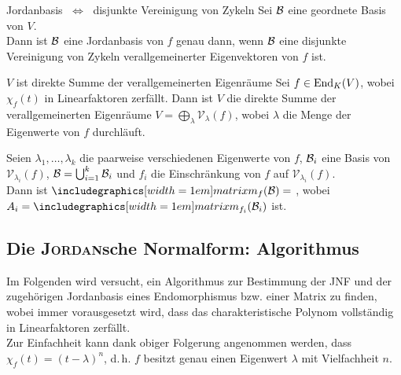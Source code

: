 \begin{Satz}{Jordanbasis $\;\Leftrightarrow\;$
             disjunkte Vereinigung von Zykeln}
    Sei $\mathcal{B}$ eine geordnete Basis von $V$. \\
    Dann ist $\mathcal{B}$ eine Jordanbasis von $f$ genau dann, wenn
    $\mathcal{B}$ eine disjunkte Vereinigung von Zykeln verallgemeinerter
    Eigenvektoren von $f$ ist.
\end{Satz}

\begin{Satz}{$V$ ist direkte Summe der verallgemeinerten Eigenräume}
    Sei $f \in \operatorname{End}_K(V)$, wobei $\chi_f(t)$ in Linearfaktoren zerfällt.
    Dann ist $V$ die direkte Summe der verallgemeinerten Eigenräume
    $V = \bigoplus_{\lambda} \mathcal{V}_\lambda(f)$, wobei $\lambda$
    die Menge der Eigenwerte von $f$ durchläuft.
\end{Satz}

\begin{Kor}
    Seien $\lambda_1, \dotsc, \lambda_k$ die paarweise verschiedenen
    Eigenwerte von $f$,
    $\mathcal{B}_i$ eine Basis von $\mathcal{V}_{\lambda_i}(f)$,
    $\mathcal{B} = \bigcup_{i=1}^k \mathcal{B}_i$ und
    $f_i$ die Einschränkung von $f$ auf $\mathcal{V}_{\lambda_{i}}(f)$. \\
    Dann ist $\enmatrix{f}{B} =$ ,
    wobei $A_i = \matrixm_{f_i}(\basis{B}_i)$ ist.
\end{Kor}

\subsection{%
    Die \textsc{Jordan}sche Normalform: Algorithmus%
}

\begin{Bem}
    Im Folgenden wird versucht, ein Algorithmus zur Bestimmung der
    JNF und der zugehörigen Jordanbasis eines
    Endomorphismus bzw. einer Matrix zu finden, wobei immer vorausgesetzt wird,
    dass das charakteristische Polynom vollständig in Linearfaktoren
    zerfällt. \\
    Zur Einfachheit kann dank obiger Folgerung angenommen werden, dass
    $\chi_f(t) = (t - \lambda)^n$, d.\,h. $f$ besitzt genau einen
    Eigenwert $\lambda$ mit Vielfachheit $n$.
\end{Bem}

